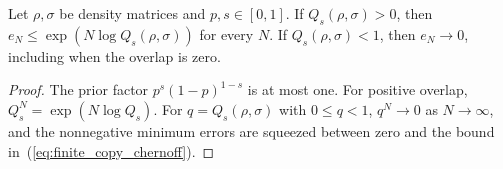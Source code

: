 \begin{theorem}
    \label{thm:chernoff_overlap_decay}
    \leanok
    Let $\rho,\sigma$ be density matrices and $p,s\in[0,1]$. If
    $Q_s(\rho,\sigma)>0$, then
    $e_N\le\exp(N\log Q_s(\rho,\sigma))$ for every $N$.
    If $Q_s(\rho,\sigma)<1$, then $e_N\to0$, including when the overlap is zero.
\end{theorem}
\begin{proof}
    \leanok
    The prior factor $p^s(1-p)^{1-s}$ is at most one. For positive overlap,
    $Q_s^N=\exp(N\log Q_s)$. For $q=Q_s(\rho,\sigma)$ with $0\le q<1$,
    $q^N\to0$ as $N\to\infty$, and the nonnegative minimum errors are squeezed between zero and
    the bound in~(\ref{eq:finite_copy_chernoff}).
\end{proof}

